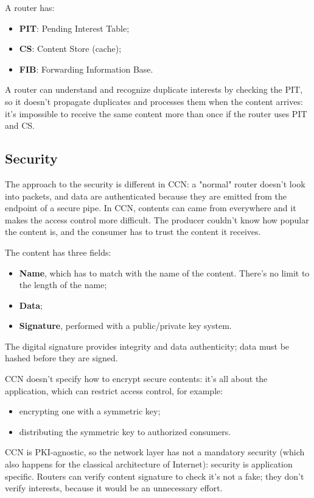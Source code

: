 A router has:
\begin{itemize}
  \item \textbf{PIT}: Pending Interest Table;
  \item \textbf{CS}: Content Store (cache);
  \item \textbf{FIB}: Forwarding Information Base.
\end{itemize}

A router can understand and recognize duplicate interests by checking the PIT,
so it doesn't propagate duplicates and processes them when the content arrives:
it's impossible to receive the same content more than once if the router uses
PIT and CS.

\subsection{Security}
The approach to the security is different in CCN: a "normal" router doesn't
look into packets, and data are authenticated because they are emitted from
the endpoint of a secure pipe. In CCN, contents can came from everywhere and it
makes the access control more difficult. The producer couldn't know how popular
the content is, and the consumer has to trust the content it receives.

The content has three fields:
\begin{itemize}
  \item \textbf{Name}, which has to match with the name of the content. There's
no limit to the length of the name;
  \item \textbf{Data};
  \item \textbf{Signature}, performed with a public/private key system.
\end{itemize}
The digital signature provides integrity and data authenticity; data must be
hashed before they are signed.

CCN doesn't specify how to encrypt secure contents: it's all about the
application, which can restrict access control, for example:
\begin{itemize}
  \item encrypting one with a symmetric key;
  \item distributing the symmetric key to authorized consumers.
\end{itemize}
CCN is PKI-agnostic, so the network layer has not a mandatory security (which
also happens for the classical architecture of Internet): security is
application specific. Routers can verify content signature to check it's not a
fake; they don't verify interests, because it would be an unnecessary effort.

